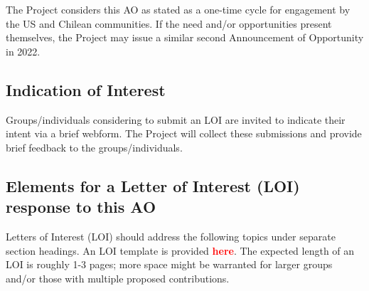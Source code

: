 \documentclass[SE,authoryear,toc,lsstdraft]{lsstdoc}
\newcommand{\FIXME}[1]{{\bf \textcolor{red}{#1}}}
\begin{document}
The Project considers this AO as stated as a one-time cycle for engagement by the US and Chilean communities. If the need and/or opportunities present themselves, the Project may issue a similar second Announcement of Opportunity in 2022. 

\subsection{Indication of Interest}

Groups/individuals considering to submit an LOI are invited to indicate their intent via a brief webform. The Project will collect these submissions and provide brief feedback to the groups/individuals. 

\subsection{Elements for a Letter of Interest (LOI) response to this AO}

Letters of Interest (LOI) should address the following topics under separate section headings. An LOI template is provided \FIXME{here}. The expected length of an LOI is roughly 1-3 pages; more space might be warranted for larger groups and/or those with multiple proposed contributions. 
\end{document}
